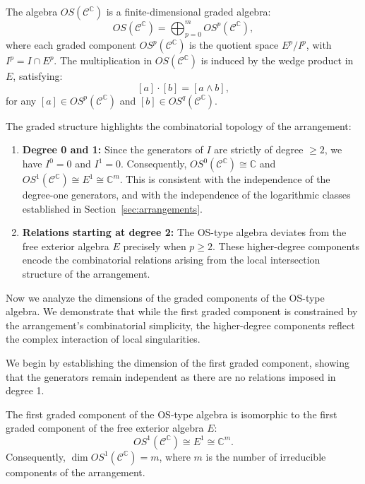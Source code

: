 \documentclass[article,11pt]{amsart} \numberwithin{equation}{section}
\numberwithin{equation}{section}
\begin{document}
{\begin{inp}
	The algebra $OS(\mathcal{C}^\mathbb{C})$ is a finite-dimensional graded algebra:
	\[ OS(\mathcal{C}^\mathbb{C}) = \bigoplus_{p=0}^m OS^p(\mathcal{C}^\mathbb{C}), \]
	where each graded component $OS^p(\mathcal{C}^\mathbb{C})$ is the quotient space $E^p / I^p$, with $I^p = I \cap E^p$. The multiplication in $OS(\mathcal{C}^\mathbb{C})$ is induced by the wedge product in $E$, satisfying:
	\[ [a] \cdot [b] = [a \wedge b], \]
	for any $[a] \in OS^p(\mathcal{C}^\mathbb{C})$ and $[b] \in OS^q(\mathcal{C}^\mathbb{C})$.
\end{inp}

\begin{rk}
	The graded structure highlights the combinatorial topology of the arrangement:
	\begin{enumerate}
		\item \textbf{Degree 0 and 1:} Since the generators of $I$ are strictly of degree $\ge 2$, we have $I^0 = 0$ and $I^1 = 0$. Consequently, $OS^0(\mathcal{C}^\mathbb{C}) \cong \mathbb{C}$ and $OS^1(\mathcal{C}^\mathbb{C}) \cong E^1 \cong \mathbb{C}^m$.
		This is consistent with the independence of the degree-one generators, and with the independence of the logarithmic classes established in Section~\ref{sec:arrangements}.
		\item \textbf{Relations starting at degree 2:} The OS-type algebra deviates from the free exterior algebra $E$ precisely when $p \ge 2$. These higher-degree components encode the combinatorial relations arising from the local intersection structure of the arrangement.
	\end{enumerate}
\end{rk}

Now we analyze the dimensions of the graded components of the OS-type algebra. We demonstrate that while the first graded component is constrained by the arrangement's combinatorial simplicity, the higher-degree components reflect the complex interaction of local singularities.

We begin by establishing the dimension of the first graded component, showing that the generators remain independent as there are no relations imposed in degree 1.

\begin{inp}\label{prop:dim_os1}
	The first graded component of the OS-type algebra is isomorphic to the first graded component of the free exterior algebra $E$:
	\[ OS^1(\mathcal{C}^\mathbb{C}) \cong E^1 \cong \mathbb{C}^m. \]
	Consequently, $\dim OS^1(\mathcal{C}^\mathbb{C}) = m$, where $m$ is the number of irreducible components of the arrangement.
\end{inp}

}
\end{document}
